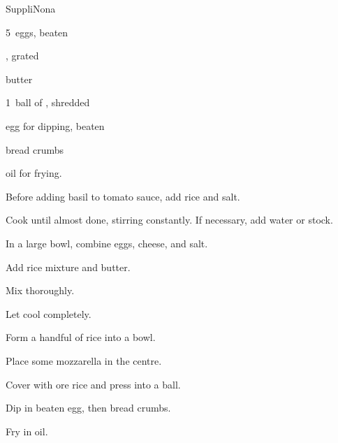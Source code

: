\begin{recipe}{Suppli}{Nona}{}

\begin{ingredients}
\item {} 
\item 5~eggs, beaten
\item {}, grated
\item \C{\quarter} butter
\item {}
\item 1~ball of , shredded
\item egg for dipping, beaten
\item bread crumbs
\item oil for frying.
\end{ingredients}

\begin{directions}
\item Before adding basil to tomato sauce, add rice and salt.
\item Cook until almost done, stirring constantly. If necessary, add water or stock.
\item In a large bowl, combine eggs, cheese, and salt.
\item Add rice mixture and butter.
\item Mix thoroughly.
\item Let cool completely.
\item Form a handful of rice into a bowl.
\item Place some mozzarella in the centre.
\item Cover with ore rice and press into a ball.
\item Dip in beaten egg, then bread crumbs.
\item Fry in oil.
\end{directions}

\end{recipe}
